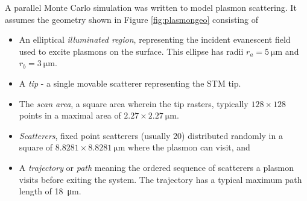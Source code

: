A parallel Monte Carlo simulation was written to model plasmon scattering.
It assumes the geometry shown in Figure \ref{fig:plasmongeo} consisting of
\begin{itemize}
	\item An elliptical {\it illuminated region}, representing the incident evanescent
	      field used to excite plasmons on the surface.  This ellipse has
	      radii $r_a=\SI{5}{\micro\meter}$ and $r_b=\SI{3}{\micro\meter}$.
	\item A {\it tip} - a single movable scatterer representing the STM tip.
	\item The {\it scan area}, a square area wherein the tip rasters, typically
	      $128\times128$ points in a maximal area of $2.27\times\SI{2.27}{\micro\meter}$.
	\item {\it Scatterers}, fixed point scatterers (usually \num{20})
	      distributed randomly in a square of $8.8281\times\SI{8.8281}{\micro\meter}$
	      where the plasmon can visit, and
	\item A {\it trajectory} or {\it path} meaning the ordered sequence of scatterers a
	      plasmon visits before exiting the system.  The trajectory has a typical maximum
	      path length of \SI{18}{\micro\meter}.
\end{itemize}
